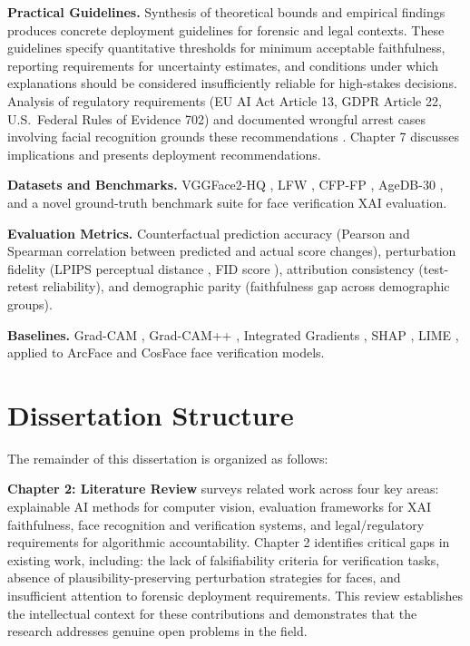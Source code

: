 \textbf{Practical Guidelines.} Synthesis of theoretical bounds and empirical findings produces concrete deployment guidelines for forensic and legal contexts. These guidelines specify quantitative thresholds for minimum acceptable faithfulness, reporting requirements for uncertainty estimates, and conditions under which explanations should be considered insufficiently reliable for high-stakes decisions. Analysis of regulatory requirements (EU AI Act Article 13, GDPR Article 22, U.S.\ Federal Rules of Evidence 702) and documented wrongful arrest cases involving facial recognition grounds these recommendations \cite{grother2019frvt,hill2020detroit,hill2023pregnant,euaiact2024,gdpr2016,fed702}. Chapter 7 discusses implications and presents deployment recommendations.

\textbf{Datasets and Benchmarks.} VGGFace2-HQ \cite{cao2018vggface2}, LFW \cite{huang2007lfw}, CFP-FP \cite{sengupta2016cfp}, AgeDB-30 \cite{moschoglou2017agedb}, and a novel ground-truth benchmark suite for face verification XAI evaluation.

\textbf{Evaluation Metrics.} Counterfactual prediction accuracy (Pearson and Spearman correlation between predicted and actual score changes), perturbation fidelity (LPIPS perceptual distance \cite{zhang2018lpips}, FID score \cite{heusel2017fid}), attribution consistency (test-retest reliability), and demographic parity (faithfulness gap across demographic groups).

\textbf{Baselines.} Grad-CAM \cite{selvaraju2019gradcam}, Grad-CAM++ \cite{chattopadhyay2018gradcampp}, Integrated Gradients \cite{Sundararajan2017_IG}, SHAP \cite{lundberg2017unified}, LIME \cite{ribeiro2016lime}, applied to ArcFace \cite{deng2019arcface} and CosFace \cite{wang2018cosface} face verification models.

\section{Dissertation Structure}
\label{sec:structure}

The remainder of this dissertation is organized as follows:

\textbf{Chapter 2: Literature Review} surveys related work across four key areas: explainable AI methods for computer vision, evaluation frameworks for XAI faithfulness, face recognition and verification systems, and legal/regulatory requirements for algorithmic accountability. Chapter 2 identifies critical gaps in existing work, including: the lack of falsifiability criteria for verification tasks, absence of plausibility-preserving perturbation strategies for faces, and insufficient attention to forensic deployment requirements. This review establishes the intellectual context for these contributions and demonstrates that the research addresses genuine open problems in the field.

